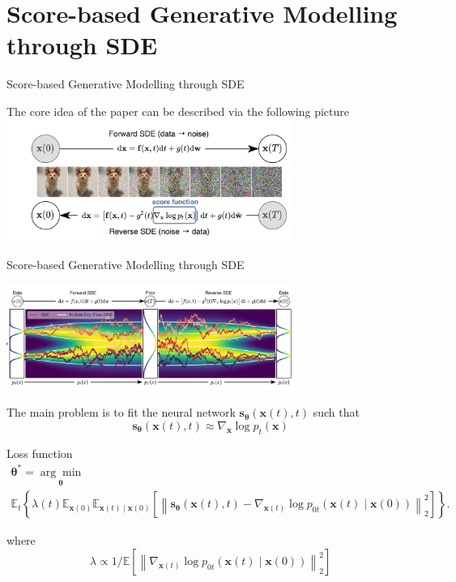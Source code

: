 \documentclass[xcolor=dvipsnames]{beamer}
\begin{document}
    \section{Score-based Generative Modelling through SDE}
    \label{sec:reverse-sde} 
    \begin{frame}{Score-based Generative Modelling through SDE}
        \begin{center}
            The core idea of the paper can be described via the following picture
            \includegraphics[width=0.7\textwidth]{pics/NoiseDenoise.png}
        \end{center}
    \end{frame}

    \begin{frame}{Score-based Generative Modelling through SDE}
        \begin{center}
            \includegraphics[width=0.7\textwidth]{pics/NoiseDenoise2.png}
        \end{center}
        The main problem is to fit the neural network $\mathbf{s}_{\boldsymbol{\theta}}(\mathbf{x}(t), t)$ such that 
        $$
        \mathbf{s}_{\boldsymbol{\theta}}(\mathbf{x}(t), t) \approx \nabla_{\mathbf{x}} \log p_t(\mathbf{x})
        $$
    \end{frame}

    \begin{frame}{Loss function}
        \begin{multline*}
            \boldsymbol{\theta}^*=\underset{\boldsymbol{\theta}}{\arg \min } \\ \mathbb{E}_t\left\{ 
            \lambda(t) \mathbb{E}_{\mathbf{x}(0)} \mathbb{E}_{\mathbf{x}(t) \mid \mathbf{x}(0)}\left[\left\|\mathbf{s}_{\boldsymbol{\theta}}(\mathbf{x}(t), t)-\nabla_{\mathbf{x}(t)} \log p_{0 t}(\mathbf{x}(t) \mid \mathbf{x}(0))\right\|_2^2\right]\right\} .
        \end{multline*}
        
        where 
        $$
        \lambda \propto 1 / \mathbb{E}\left[\left\|\nabla_{\mathbf{x}(t)} \log p_{0 t}(\mathbf{x}(t) \mid \mathbf{x}(0))\right\|_2^2\right]
        $$
    \end{frame}
\end{document}
